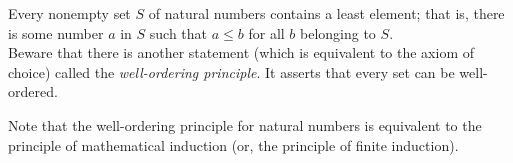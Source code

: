 \documentclass[12pt]{article}
\begin{document}
Every nonempty set $S$ of natural numbers contains a least element; that is, there is some number $a$ in $S$ such that $a \leq b$ for all $b$ belonging to $S$.\\

Beware that there is another statement (which is equivalent to the axiom of choice) called the \emph{well-ordering principle}. It asserts that every set can be well-ordered.

Note that the well-ordering principle for natural numbers is equivalent to the principle of mathematical induction (or, the principle of finite induction).
\end{document}
